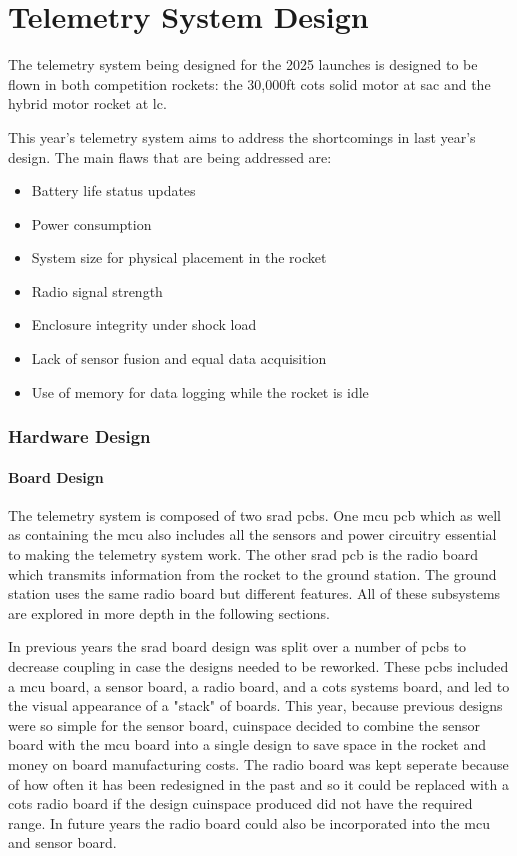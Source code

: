 \part{Telemetry System Design}

The telemetry system being designed for the 2025 launches is designed to be flown in both competition rockets: the
30,000ft \gls{cots} solid motor at \gls{sac} and the hybrid motor rocket at \gls{lc}.

This year's telemetry system aims to address the shortcomings in last year's design. The main flaws that are being
addressed are:

\begin{itemize}
    \item Battery life status updates
    \item Power consumption
    \item System size for physical placement in the rocket
    \item Radio signal strength
    \item Enclosure integrity under shock load
    \item Lack of sensor fusion and equal data acquisition
    \item Use of memory for data logging while the rocket is idle
\end{itemize}

\section{Hardware Design}

\subsection{Board Design}

The telemetry system is composed of two \gls{srad} \gls{pcb}s. One \gls{mcu} \gls{pcb} which as well as containing the
\gls{mcu} also includes all the sensors and power circuitry essential to making the telemetry system work. The other
\gls{srad} \gls{pcb} is the radio board which transmits information from the rocket to the ground station. The ground 
station uses the same radio board but different features. All of these subsystems are explored in more depth in the 
following sections.

In previous years the \gls{srad} board design was split over a number of \glspl{pcb} to decrease coupling in case the
designs needed to be reworked. These \glspl{pcb} included a \gls{mcu} board, a sensor board, a radio board,
and a \gls{cots} systems board, and led to the visual appearance of a "stack" of boards. This year, because previous
designs were so simple for the sensor board, \gls{cuinspace} decided to combine the sensor board with the \gls{mcu} board
into a single design to save space in the rocket and money on board manufacturing costs. The radio board was kept 
seperate because of how often it has been redesigned in the past and so it could be replaced with a \gls{cots} radio
board if the design \gls{cuinspace} produced did not have the required range. In future years the radio board could also
be incorporated into the \gls{mcu} and sensor board.

